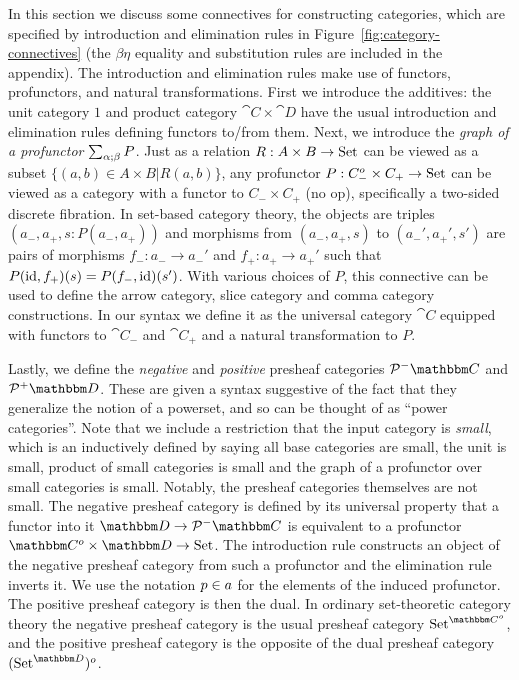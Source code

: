 \documentclass{llncs}
\begin{document}
In this section we discuss some connectives for constructing categories,
which are specified by introduction and elimination rules in
Figure~\ref{fig:category-connectives} (the $\beta\eta$ equality and
substitution rules are included in the appendix).  The introduction and
elimination rules make use of functors, profunctors, and natural
transformations.
%
First we introduce the additives: the unit category $1$ and product
category $\cat C \times \cat D$ have the usual introduction and
elimination rules defining functors to/from them.  
%
Next, we introduce the \emph{graph of a profunctor} $\graphProf \alpha
\beta P$. Just as a relation $R : A \times B \to \Set$ can be viewed
as a subset $\{ (a,b) \in A\times B | R(a,b)\}$, any profunctor $P :
C_-^o\times C_+ \to \Set$ can be viewed as a category with a functor
to $C_- \times C_+$ (no op), specifically a two-sided discrete
fibration. In set-based category theory, the objects are triples
$(a_-, a_+, s : P(a_-,a_+))$ and morphisms from $(a_-,a_+, s)$ to
$(a_-',a_+', s')$ are pairs of morphisms $f_- : a_- \to a_-'$ and $f_+
: a_+ \to a_+'$ such that $P(\id,f_+)(s) = P(f_-,\id)(s')$.
%
With various choices of $P$, this connective can be used to define the
arrow category, slice category and comma category constructions.
%
In our syntax we define it as the universal category $\cat C$ equipped
with functors to $\cat C_-$ and $\cat C_+$ and a natural transformation to $P$.

Lastly, we define the \emph{negative} and \emph{positive} presheaf
categories $\negPresheaf \cat C$ and $\posPresheaf \cat D$. These are
given a syntax suggestive of the fact that they generalize the notion
of a powerset, and so can be thought of as ``power categories''.
%
Note that we include a restriction that the input category is
\emph{small}, which is an inductively defined by saying all base
categories are small, the unit is small, product of small categories
is small and the graph of a profunctor over small categories is
small. Notably, the presheaf categories themselves are not small.
%
The negative presheaf category is defined by its universal property
that a functor into it $\cat D \to \negPresheaf \cat C$ is equivalent
to a profunctor $\cat C^o \times \cat D \to \Set$.
%
The introduction rule constructs an object of the negative presheaf
category from such a profunctor and the elimination rule inverts
it. We use the notation $\negPresheafApp a p$ for the elements of the
induced profunctor.
%
The positive presheaf category is then the dual. In ordinary
set-theoretic category theory the negative presheaf category is the
usual presheaf category $\Set^{\cat C^o}$, and the positive presheaf
category is the opposite of the dual presheaf category $(\Set^{\cat
  D})^o$.
\end{document}
